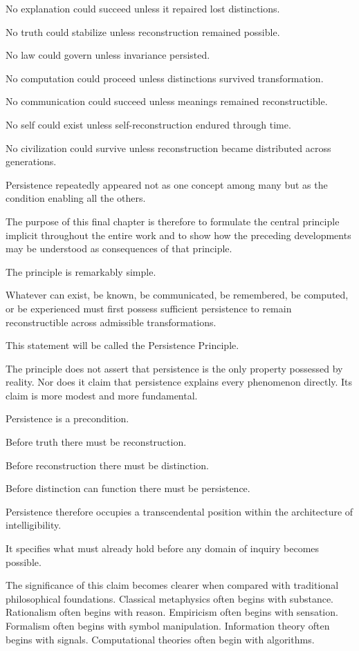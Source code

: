 \documentclass[12pt,oneside]{article}
\theoremstyle{definition}
\begin{document}
No explanation could succeed unless it repaired lost distinctions.

No truth could stabilize unless reconstruction remained possible.

No law could govern unless invariance persisted.

No computation could proceed unless distinctions survived transformation.

No communication could succeed unless meanings remained reconstructible.

No self could exist unless self-reconstruction endured through time.

No civilization could survive unless reconstruction became distributed across generations.

Persistence repeatedly appeared not as one concept among many but as the condition enabling all the others.

The purpose of this final chapter is therefore to formulate the central principle implicit throughout the entire work and to show how the preceding developments may be understood as consequences of that principle.

The principle is remarkably simple.

Whatever can exist, be known, be communicated, be remembered, be computed, or be experienced must first possess sufficient persistence to remain reconstructible across admissible transformations.

This statement will be called the Persistence Principle.

The principle does not assert that persistence is the only property possessed by reality. Nor does it claim that persistence explains every phenomenon directly. Its claim is more modest and more fundamental.

Persistence is a precondition.

Before truth there must be reconstruction.

Before reconstruction there must be distinction.

Before distinction can function there must be persistence.

Persistence therefore occupies a transcendental position within the architecture of intelligibility.

It specifies what must already hold before any domain of inquiry becomes possible.

The significance of this claim becomes clearer when compared with traditional philosophical foundations. Classical metaphysics often begins with substance. Rationalism often begins with reason. Empiricism often begins with sensation. Formalism often begins with symbol manipulation. Information theory often begins with signals. Computational theories often begin with algorithms.
\end{document}
